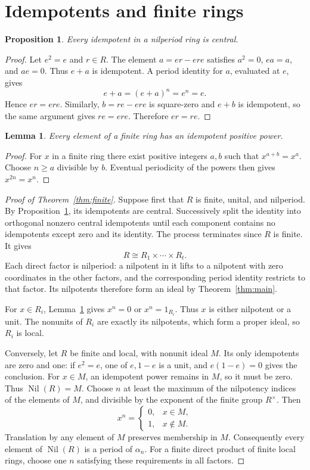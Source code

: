 \documentclass[11pt]{article}
\newtheorem{lemma}[theorem]{Lemma}
\newtheorem{proposition}[theorem]{Proposition}
\theoremstyle{remark}
\DeclareMathOperator{\Nil}{Nil}
\begin{document}
\section{Idempotents and finite rings}
\begin{proposition}\label{prop:central}
Every idempotent in a nilperiod ring is central.
\end{proposition}
\begin{proof}
Let $e^2=e$ and $r\in R$. The element $a=er-ere$ satisfies
$a^2=0$, $ea=a$, and $ae=0$. Thus $e+a$ is idempotent.
A period identity for $a$, evaluated at $e$, gives
\[
 e+a=(e+a)^n=e^n=e.
\]
Hence $er=ere$. Similarly, $b=re-ere$ is square-zero and $e+b$ is
idempotent, so the same argument gives $re=ere$. Therefore $er=re$.
\end{proof}

\begin{lemma}\label{lem:idempotent-power}
Every element of a finite ring has an idempotent positive power.
\end{lemma}
\begin{proof}
For $x$ in a finite ring there exist positive integers $a,b$ such that
$x^{a+b}=x^a$. Choose $n\geq a$ divisible by $b$. Eventual periodicity
of the powers then gives $x^{2n}=x^n$.
\end{proof}

\begin{proof}[Proof of Theorem~\ref{thm:finite}]
Suppose first that $R$ is finite, unital, and nilperiod. By
Proposition~\ref{prop:central}, its idempotents are central.
Successively split the identity into orthogonal nonzero central idempotents
until each component contains no idempotents except zero and its identity.
The process terminates since $R$ is finite. It gives
\[
 R\cong R_1\times\cdots\times R_t.
\]
Each direct factor is nilperiod: a nilpotent in it lifts to a nilpotent
with zero coordinates in the other factors, and the corresponding period
identity restricts to that factor. Its nilpotents therefore form an ideal
by Theorem~\ref{thm:main}.

For $x\in R_i$, Lemma~\ref{lem:idempotent-power} gives $x^n=0$ or
$x^n=1_{R_i}$. Thus $x$ is either nilpotent or a unit. The nonunits of
$R_i$ are exactly its nilpotents, which form a proper ideal, so $R_i$ is
local.

Conversely, let $R$ be finite and local, with nonunit ideal $M$.
Its only idempotents are zero and one: if $e^2=e$, one of $e,1-e$ is a
unit, and $e(1-e)=0$ gives the conclusion.
For $x\in M$, an idempotent power remains in $M$, so it must be zero.
Thus $\Nil(R)=M$. Choose $n$ at least the maximum of the nilpotency
indices of the elements of $M$, and divisible by the exponent of the
finite group $R^\times$. Then
\[
 x^n=\begin{cases}0,&x\in M,\\1,&x\notin M.\end{cases}
\]
Translation by any element of $M$ preserves membership in $M$.
Consequently every element of $\Nil(R)$ is a period of $\alpha_n$.
For a finite direct product of finite local rings, choose one $n$
satisfying these requirements in all factors.
\end{proof}
\end{document}
